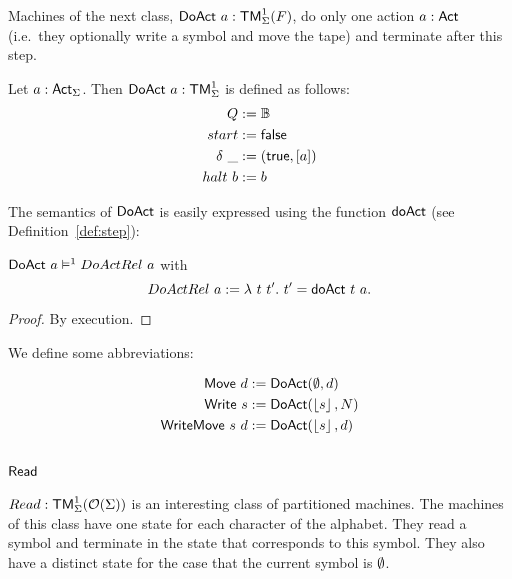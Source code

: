 Machines of the next class, $\mathsf{DoAct}~a : \mathsf{TM}_\Sigma^1(F)$, do only one action $a:\mathsf{Act}$ (i.e.\ they optionally write a symbol and move the tape) and
terminate after this step.
\begin{definition}[$\MS{DoAct}~a$][DoAct]
  \label{def:DoAct}
  Let $a:\mathsf{Act}_\Sigma$.  Then $\mathsf{DoAct}~a : \mathsf{TM}_\Sigma^1$ is defined as follows:
  \begin{align*}
    Q          &:= \mathbb{B} \\
    start      &:= \mathsf{false} \\
    \delta ~\_ &:= (\mathsf{true}, \left[ a \right]) \\
    halt   ~ b &:= b
  \end{align*}
\end{definition}
The semantics of $\mathsf{DoAct}$ is easily expressed using the function $\mathsf{doAct}$ (see Definition~\ref{def:step}):
\begin{lemma}
  \label{lem:DoAct_Sem} $\mathsf{DoAct}~a \mathrel{\vDash^{1}} DoActRel~a$ with
  \[
    DoActRel~a := \lambda~t~t'.~ t' = \mathsf{doAct}~t~a.
  \]
\end{lemma}
\begin{proof}
  By execution.
\end{proof}
We define some abbreviations:
\begin{definition}
 \label{def:DoAct-derived} 
 \begin{align*}
   \mathsf{Move}       ~d &:= \mathsf{DoAct} (\emptyset, d) \\
   \mathsf{Write}    ~s   &:= \mathsf{DoAct} (\left\lfloor {s} \right\rfloor, N) \\
   \mathsf{WriteMove}~s~d &:= \mathsf{DoAct} (\left\lfloor {s} \right\rfloor, d)
 \end{align*}
\end{definition}


\subsection{$\mathsf{Read}$}
\label{sec:basic_machines-Read}

$Read : \mathsf{TM}_\Sigma^1(\mathcal{O}(\Sigma))$ is an interesting class of partitioned machines.  The machines of this class have one state for each character
of the alphabet.  They read a symbol and terminate in the state that corresponds to this symbol.  They also have a distinct state for the case that
the current symbol is $\emptyset$.

